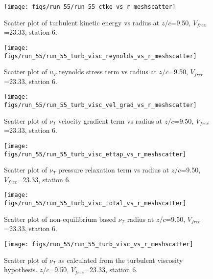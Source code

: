 \begin{figure}[H]
\centering
\texttt{[image: figs/run\_55/run\_55\_ctke\_vs\_r\_meshscatter]}
\caption{Scatter plot of turbulent kinetic energy vs radius at $z/c$=9.50, $V_{free}$=23.33, station 6.}
\end{figure}


\begin{figure}[H]
\centering
\texttt{[image: figs/run\_55/run\_55\_turb\_visc\_reynolds\_vs\_r\_meshscatter]}
\caption{Scatter plot of $
u_T$ reynolds stress term vs radius at $z/c$=9.50, $V_{free}$=23.33, station 6.}
\end{figure}


\begin{figure}[H]
\centering
\texttt{[image: figs/run\_55/run\_55\_turb\_visc\_vel\_grad\_vs\_r\_meshscatter]}
\caption{Scatter plot of $\nu_T$ velocity gradient term vs radius at $z/c$=9.50, $V_{free}$=23.33, station 6.}
\end{figure}


\begin{figure}[H]
\centering
\texttt{[image: figs/run\_55/run\_55\_turb\_visc\_ettap\_vs\_r\_meshscatter]}
\caption{Scatter plot of $\nu_T$ pressure relaxation term vs radius at $z/c$=9.50, $V_{free}$=23.33, station 6.}
\end{figure}


\begin{figure}[H]
\centering
\texttt{[image: figs/run\_55/run\_55\_turb\_visc\_total\_vs\_r\_meshscatter]}
\caption{Scatter plot of non-equilibrium based $\nu_T$ radius at $z/c$=9.50, $V_{free}$=23.33, station 6.}
\end{figure}


\begin{figure}[H]
\centering
\texttt{[image: figs/run\_55/run\_55\_turb\_visc\_vs\_r\_meshscatter]}
\caption{Scatter plot of $\nu_T$ as calculated from the turbulent viscosity hypothesis. $z/c$=9.50, $V_{free}$=23.33, station 6.}
\end{figure}


